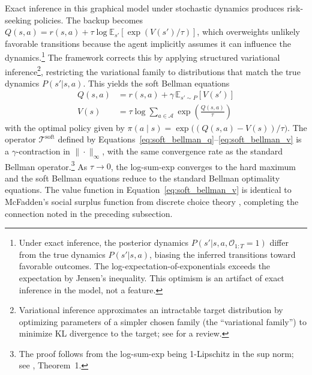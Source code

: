 Exact inference in this graphical model under stochastic dynamics produces risk-seeking policies. The backup becomes $Q(s,a) = r(s,a) + \tau \log \mathbb{E}_{s'}[\exp(V(s')/\tau)]$, which overweights unlikely favorable transitions because the agent implicitly assumes it can influence the dynamics.\footnote{Under exact inference, the posterior dynamics $P(s'|s,a,\mathcal{O}_{1:T}=1)$ differ from the true dynamics $P(s'|s,a)$, biasing the inferred transitions toward favorable outcomes. The log-expectation-of-exponentials exceeds the expectation by Jensen's inequality. This optimism is an artifact of exact inference in the model, not a feature.} The framework corrects this by applying structured variational inference\footnote{Variational inference approximates an intractable target distribution by optimizing parameters of a simpler chosen family (the ``variational family'') to minimize KL divergence to the target; see \citet{BleiKucukelbirMcAuliffe2017} for a review.}, restricting the variational family to distributions that match the true dynamics $P(s'|s,a)$. This yields the soft Bellman equations
\begin{align}
Q(s,a) &= r(s,a) + \gamma \, \mathbb{E}_{s' \sim P}[V(s')] \label{eq:soft_bellman_q} \\
V(s) &= \tau \log \sum_{a \in \mathcal{A}} \exp\!\left(\frac{Q(s,a)}{\tau}\right) \label{eq:soft_bellman_v}
\end{align}
with the optimal policy given by $\pi(a \mid s) = \exp\bigl((Q(s,a) - V(s))/\tau\bigr)$. The operator $\mathcal{T}^{\mathrm{soft}}$ defined by Equations~\eqref{eq:soft_bellman_q}--\eqref{eq:soft_bellman_v} is a $\gamma$-contraction in $\|\cdot\|_\infty$, with the same convergence rate as the standard Bellman operator.\footnote{The proof follows from the log-sum-exp being 1-Lipschitz in the sup norm; see \citet{Haarnoja2017}, Theorem~1.} As $\tau \to 0$, the log-sum-exp converges to the hard maximum and the soft Bellman equations reduce to the standard Bellman optimality equations. The value function in Equation~\eqref{eq:soft_bellman_v} is identical to McFadden's social surplus function from discrete choice theory \citep{McFadden1978}, completing the connection noted in the preceding subsection.

